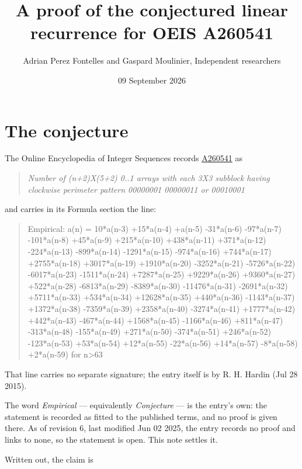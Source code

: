 \documentclass[11pt]{article}
\title{A proof of the conjectured linear recurrence for OEIS A260541}
\author{Adrian Perez Fontelles and Gaspard Moulinier, Independent researchers}
\date{09 September 2026}
\theoremstyle{definition}
\begin{document}
\maketitle
\section{The conjecture}

The Online Encyclopedia of Integer Sequences records \href{https://oeis.org/A260541}{A260541} as

\begin{quote}\itshape Number of (n+2)X(5+2) 0..1 arrays with each 3X3 subblock having clockwise perimeter pattern 00000001 00000011 or 00010001\end{quote}

and carries in its Formula section the line:

\begin{quote}\ttfamily Empirical: a(n) = 10*a(n-3) +15*a(n-4) +a(n-5) -31*a(n-6) -97*a(n-7) -101*a(n-8) +45*a(n-9) +215*a(n-10) +438*a(n-11) +371*a(n-12) -224*a(n-13) -899*a(n-14) -1291*a(n-15) -974*a(n-16) +744*a(n-17) +2755*a(n-18) +3017*a(n-19) +1910*a(n-20) -3252*a(n-21) -5726*a(n-22) -6017*a(n-23) -1511*a(n-24) +7287*a(n-25) +9229*a(n-26) +9360*a(n-27) +522*a(n-28) -6813*a(n-29) -8389*a(n-30) -11476*a(n-31) -2691*a(n-32) +5711*a(n-33) +534*a(n-34) +12628*a(n-35) +440*a(n-36) -1143*a(n-37) +1372*a(n-38) -7359*a(n-39) +2358*a(n-40) -3274*a(n-41) +1777*a(n-42) +442*a(n-43) -467*a(n-44) +1568*a(n-45) -1166*a(n-46) +811*a(n-47) -313*a(n-48) -155*a(n-49) +271*a(n-50) -374*a(n-51) +246*a(n-52) -123*a(n-53) +53*a(n-54) +12*a(n-55) -22*a(n-56) +14*a(n-57) -8*a(n-58) +2*a(n-59) for n>63\end{quote}

That line carries no separate signature; the entry itself is by R. H. Hardin (Jul 28 2015).

The word {\itshape Empirical} --- equivalently {\itshape Conjecture} --- is the entry's own: the statement is recorded as fitted to the published terms, and no proof is given there. As of revision 6, last modified Jun 02 2025, the entry records no proof and links to none, so the statement is open. This note settles it.

Written out, the claim is
\end{document}
